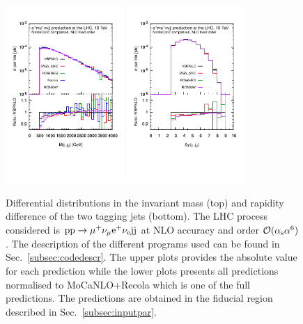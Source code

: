  \begin{figure}[hbt!]
   \centering
   \includegraphics[width=0.4\textwidth,angle=0,clip=true,trim={0.4cm 2cm 0.cm 1.cm}]{figures/NLO/mjj_NLO.pdf}
   \includegraphics[width=0.4\textwidth,angle=0,clip=true,trim={0.4cm 2cm 0.cm 1.cm}]{figures/NLO/dyj1j2_NLO.pdf}
\caption{\label{fig:distNLO1} Differential distributions in the invariant mass (top) and rapidity difference of the two tagging jets (bottom).
The LHC process considered is ${\rm p}{\rm p}\to\mu^+\nu_\mu{\rm e}^+\nu_{\rm e}{\rm j}{\rm j}$ at NLO accuracy and order $\mathcal{O}(\alpha_{\rm s}\alpha^6)$.
The description of the different programs used can be found in Sec.~\ref{subsec:codedescr}.
The upper plots provides the absolute value for each prediction while the lower plots presents all predictions normalised to {\sc MoCaNLO}+{\sc Recola} which is one of the full predictions.
The predictions are obtained in the fiducial region described in Sec.~\ref{subsec:inputpar}.
}
\end{figure}

